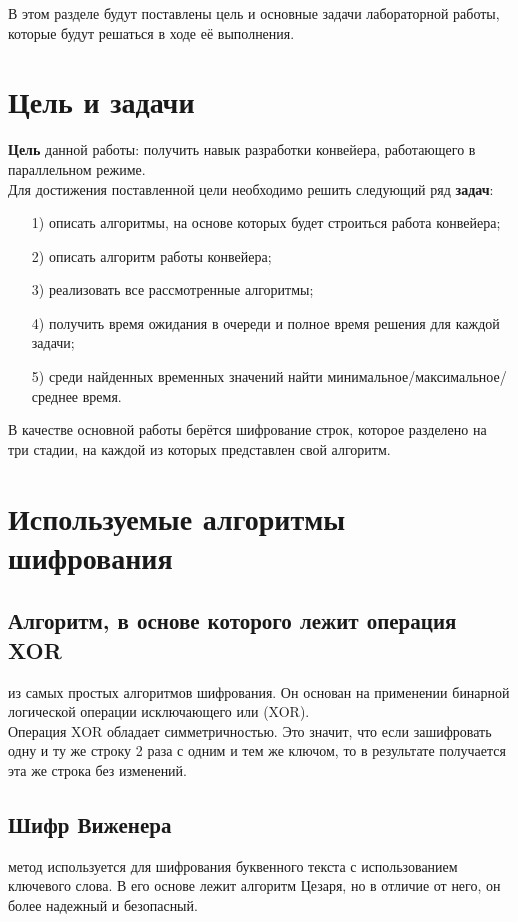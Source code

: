В этом разделе будут поставлены цель и основные задачи лабораторной работы, которые будут решаться в ходе её выполнения.

\section{Цель и задачи}
\qquad\textbf{Цель} данной работы: получить навык разработки конвейера, работающего в параллельном режиме.\\

Для достижения поставленной цели необходимо решить следующий ряд \textbf{задач}:
\begin{enumerate}
	\item[1)] описать алгоритмы, на основе которых будет строиться работа конвейера;
	\item[2)] описать алгоритм работы конвейера;
	\item[3)] реализовать все рассмотренные алгоритмы;
	\item[4)] получить время ожидания в очереди и полное время решения для каждой задачи;
	\item[5)] среди найденных временных значений найти минимальное/максимальное/среднее время.
\end{enumerate}

В качестве основной работы берётся шифрование строк, которое разделено на три стадии, на каждой из которых представлен свой алгоритм.

\section{Используемые алгоритмы шифрования}

\subsection{Алгоритм, в основе которого лежит операция XOR}
 из самых простых алгоритмов шифрования. Он основан на применении бинарной логической операции исключающего или (XOR). \\

Операция XOR обладает симметричностью. Это значит, что если зашифровать одну и ту же строку 2 раза с одним и тем же ключом, то в результате получается эта же строка без изменений.

\subsection{Шифр Виженера}
 метод используется для шифрования буквенного текста с использованием ключевого слова. В его основе лежит алгоритм Цезаря, но в отличие от него, он более надежный и безопасный. \\

